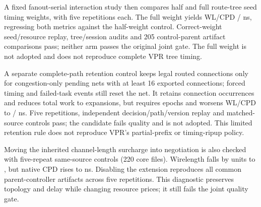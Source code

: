 \documentclass[10pt]{article}
\begin{document}
A fixed fanout-serial interaction study then compares half and full
route-tree seed timing weights, with five repetitions each. The full
weight yields WL/CPD \FullSeedFanoutWL{}/\FullSeedFanoutCPD{} ns,
regressing both metrics against the half-weight control. Correct-weight
seed/resource replay, tree/session audits and 205 control-parent artifact
comparisons pass; neither arm passes the original joint gate. The full
weight is not adopted and does not reproduce complete VPR tree timing.

A separate complete-path retention control keeps legal routed connections
only for congestion-only pending nets with at least 16 exported connections;
forced timing and failed-task events still reset the net. It retains
\LegalRetainedOccurrences{} connection occurrences and reduces total work
to \LegalRetentionExpanded{} expansions, but requires \LegalRetentionEpochs{}
epochs and worsens WL/CPD to \LegalRetentionWL{}/\LegalRetentionCPD{} ns.
Five repetitions, independent decision/path/version replay and matched-source
controls pass; the candidate fails quality and is not adopted. This limited
retention rule does not reproduce VPR's partial-prefix or timing-ripup policy.

Moving the inherited channel-length surcharge into negotiation is also
checked with five-repeat same-source controls (220 core files).
Wirelength falls by \SpanWLReduction{} units to \SpanWL{}, but native CPD
rises to \SpanCPD{} ns. Disabling the extension reproduces all
\SpanCompatibleArtifacts{} common parent-controller artifacts across five
repetitions. This diagnostic preserves topology and delay while changing
resource prices; it still fails the joint quality gate.
\end{document}
